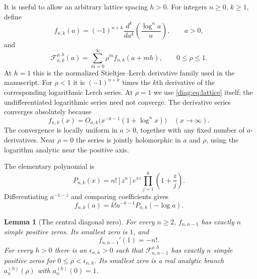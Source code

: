 \documentclass[11pt,a4paper]{article}
\newtheorem{lemma}[theorem]{Lemma}
\theoremstyle{definition}
\theoremstyle{remark}
\numberwithin{equation}{section}
\begin{document}
It is useful to allow an arbitrary lattice spacing $h>0$.  For integers
$n\geq0$, $k\geq1$, define
\begin{equation}\label{diag:eq:f}
 f_{n,k}(a)=(-1)^{n+k}\frac{d^k}{da^k}
                 \left(\frac{\log^n a}{a}\right),\qquad a>0,
\end{equation}
and
\begin{equation}\label{diag:eq:lattice}
 \mathscr F_{n,k}^{\rho,h}(a)
       =\sum_{m=0}^{\infty}\rho^m f_{n,k}(a+mh),
       \qquad 0\leq\rho\leq1.
\end{equation}
At $h=1$ this is the normalized Stieltjes--Lerch derivative family used in
the manuscript.  For $\rho<1$ it is $(-1)^{n+k}$ times the $k$th derivative
of the corresponding logarithmic Lerch series.  At $\rho=1$ we use
\eqref{diag:eq:lattice} itself; the undifferentiated logarithmic series need
not converge.  The derivative series converges absolutely because
\[
 f_{n,k}(x)=O_{n,k}\bigl(x^{-k-1}(1+\log^n x)\bigr)
 \quad(x\longrightarrow\infty).
\]
The convergence is locally uniform in $a>0$, together with any fixed
number of $a$-derivatives.  Near $\rho=0$ the series is jointly holomorphic
in $a$ and $\rho$, using the logarithm analytic near the positive axis.

The elementary polynomial is
\begin{equation}\label{diag:eq:P}
 P_{n,k}(x)=n![z^n]e^{xz}\prod_{j=1}^{k}\left(1+\frac zj\right).
\end{equation}
Differentiating $a^{-1-z}$ and comparing coefficients gives
\begin{equation}\label{diag:eq:elementary}
 f_{n,k}(a)=k!a^{-k-1}P_{n,k}(-\log a).
\end{equation}

\begin{lemma}[The central diagonal zero]\label{diag:lem:central}
For every $n\geq2$, $f_{n,n-1}$ has exactly $n$ simple positive zeros.
Its smallest zero is $1$, and
\begin{equation}\label{diag:eq:central-derivative}
 f_{n,n-1}'(1)=-n!.
\end{equation}
For every $h>0$ there is an $\epsilon_{n,h}>0$ such that
$\mathscr F_{n,n-1}^{\rho,h}$ has exactly $n$ simple positive zeros for
$0\leq\rho<\epsilon_{n,h}$.  Its smallest zero is a real analytic branch
$a_n^{(h)}(\rho)$ with $a_n^{(h)}(0)=1$.
\end{lemma}
\end{document}
